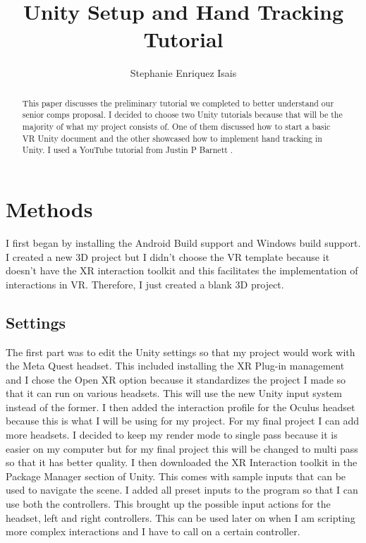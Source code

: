 \documentclass[11pt,twocolumn]{article}
\title{Unity Setup and Hand Tracking Tutorial}
\author{Stephanie Enriquez Isais}
\affiliation{Occidental College}
\begin{document}
\maketitle

\begin{abstract}
    This paper discusses the preliminary tutorial we completed to better understand our senior comps proposal. I decided to choose two Unity tutorials because that will be the majority of what my project consists of. One of them discussed how to start a basic VR Unity document and the other showcased how to implement hand tracking in Unity. I used a YouTube tutorial from Justin P Barnett \cite{vrsetup2022}. 
\end{abstract}

\section{Methods}
I first began by installing the Android Build support and Windows build support. I created a new 3D project but I didn’t choose the VR template because it doesn’t have the XR interaction toolkit and this facilitates the implementation of interactions in VR. Therefore, I just created a blank 3D project. 


\subsection{Settings}
The first part was to edit the Unity settings so that my project would work with the Meta Quest headset. This included installing the XR Plug-in management and I chose the Open XR option because it standardizes the project I made so that it can run on various headsets. This will use the new Unity input system instead of the former. I then added the interaction profile for the Oculus headset because this is what I will be using for my project. For my final project I can add more headsets. I decided to keep my render mode to single pass because it is easier on my computer but for my final project this will be changed to multi pass so that it has better quality. I then downloaded the XR Interaction toolkit in the Package Manager section of Unity. This comes with sample inputs that can be used to navigate the scene. I added all preset inputs to the program so that I can use both the controllers. This brought up the possible input actions for the headset, left and right controllers. This can be used later on when I am scripting more complex interactions and I have to call on a certain controller.
\end{document}
